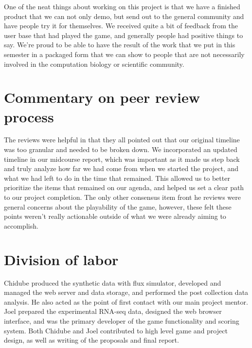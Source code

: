 \documentclass[12pt]{article}
\begin{document}
One of the neat things about working on this project is that we have a finished product that we can not only demo, but send out to the general community and have people try it for themselves.
We received quite a bit of feedback from the user base that had played the game, and generally people had positive things to say. We're proud to be able to have the result of the work
that we put in this semester in a packaged form that we can show to people that are not necessarily involved in the computation biology or scientific community.

\section*{Commentary on peer review process}

The reviews were helpful in that they all pointed out that our original timeline was too granular and needed to be broken down. We incorporated an updated timeline in our midcourse
report, which was important as it made us step back and truly analyze how far we had come from when we started the project, and what we had left to do in the time that remained. This
allowed us to better prioritize the items that remained on our agenda, and helped us set a clear path to our project completion. The only other consensus item front he reviews were general
concerns about the playability of the game, however, these felt these points weren't really actionable outside of what we were already aiming to accomplish.

\section*{Division of labor}

Chidube produced the synthetic data with flux simulator, developed and managed the web server and data storage, and performed the post collection data analysis. He also acted as the point
 of first contact with our main project mentor. Joel prepared the experimental RNA-seq data, designed the web browser interface, and was the primary developer of the game functionality and 
 scoring system. Both Chidube and Joel contributed to high level game and project design, as well as writing of the proposals and final report.


\end{document}
